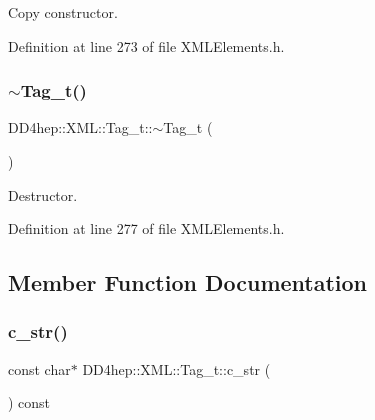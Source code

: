 Copy constructor. 



Definition at line 273 of file X\+M\+L\+Elements.\+h.

\hypertarget{class_d_d4hep_1_1_x_m_l_1_1_tag__t_aa35071670ab5dcfe1c20aa8370c818a7}{}\label{class_d_d4hep_1_1_x_m_l_1_1_tag__t_aa35071670ab5dcfe1c20aa8370c818a7} 
\subsubsection{\texorpdfstring{$\sim$\+Tag\+\_\+t()}{~Tag\_t()}}
{\footnotesize\ttfamily D\+D4hep\+::\+X\+M\+L\+::\+Tag\+\_\+t\+::$\sim$\+Tag\+\_\+t (\begin{DoxyParamCaption}{ }\end{DoxyParamCaption})\hspace{0.3cm}{\ttfamily [inline]}}



Destructor. 



Definition at line 277 of file X\+M\+L\+Elements.\+h.



\subsection{Member Function Documentation}
\hypertarget{class_d_d4hep_1_1_x_m_l_1_1_tag__t_aae61fda0d31d078cf195a4446fc771a0}{}\label{class_d_d4hep_1_1_x_m_l_1_1_tag__t_aae61fda0d31d078cf195a4446fc771a0} 
\subsubsection{\texorpdfstring{c\+\_\+str()}{c\_str()}}
{\footnotesize\ttfamily const char$\ast$ D\+D4hep\+::\+X\+M\+L\+::\+Tag\+\_\+t\+::c\+\_\+str (\begin{DoxyParamCaption}{ }\end{DoxyParamCaption}) const\hspace{0.3cm}{\ttfamily [inline]}}



